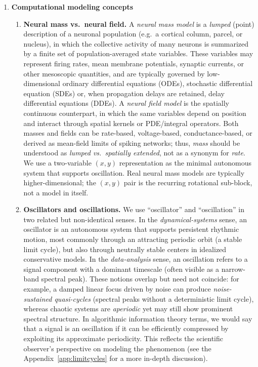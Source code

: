 \documentclass[12pt]{article}
\numberwithin{equation}{section}
\newcommand{\rev}[1]{\begingroup\color{navyblue}#1\endgroup}
\begin{document}
\begin{enumerate}
\item \textbf{Computational modeling concepts} 
\begin{enumerate} 
\item  \rev{\textbf{Neural mass vs.\ neural field.}
A \emph{neural mass model} is a \emph{lumped} (point) description of a neuronal
population (e.g.\ a cortical column, parcel, or nucleus), in which the collective activity
of many neurons is summarized by a finite set of population-averaged state variables.
These variables may represent firing rates, mean membrane potentials, synaptic currents,
or other mesoscopic quantities, and are typically governed by low-dimensional ordinary differential equations (ODEs), stochastic differential equation (SDEs) or,
when propagation delays are retained,  delay differential equations (DDEs).
A \emph{neural field model} is the spatially continuous counterpart, in which the same
variables depend on position and interact through spatial kernels or PDE/integral operators.
Both masses and fields can be rate-based, voltage-based, conductance-based, or derived
as mean-field limits of spiking networks; thus, \emph{mass} should be understood as
\emph{lumped vs.\ spatially extended}, not as a synonym for \emph{rate}.
\smallskip
We use a two-variable $(x,y)$ representation as the minimal autonomous system that supports oscillation. Real neural mass models are typically higher-dimensional; the $(x,y)$ pair is the recurring rotational sub-block, not a model in itself.}


\item 
\rev{\textbf{Oscillators and oscillations.}
We use ``oscillator'' and ``oscillation'' in two related but non-identical senses.
In the \emph{dynamical-systems} sense, an oscillator is an autonomous system that supports
persistent rhythmic motion, most commonly through an attracting periodic orbit (a stable
limit cycle), but also through neutrally stable centers in idealized conservative models.
In the \emph{data-analysis} sense, an oscillation refers to a signal component with a
dominant timescale (often visible as a narrow-band spectral peak).
These notions overlap but need not coincide: for example, a damped linear focus driven by
noise can produce \emph{noise-sustained quasi-cycles} (spectral peaks without a deterministic
limit cycle), whereas chaotic systems are \emph{aperiodic} yet may still show prominent
spectral structure.
In algorithmic information theory terms, we would say that a signal is an oscillation if it can be efficiently compressed by exploiting its approximate periodicity. This reflects the scientific observer's perspective on modeling the phenomenon (see the Appendix~\ref{app:limitcycles} for a more in-depth discussion)}.


\end{enumerate}
\end{enumerate}
\end{document}
